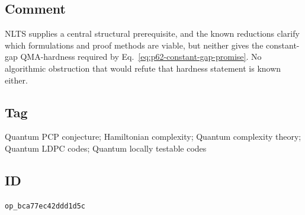 \subsection*{Comment}

NLTS supplies a central structural prerequisite, and the known reductions
clarify which formulations and proof methods are viable, but neither gives
the constant-gap QMA-hardness required by
Eq.~\eqref{eq:p62-constant-gap-promise}.  No algorithmic obstruction that
would refute that hardness statement is known either.

\subsection*{Tag}

Quantum PCP conjecture; Hamiltonian complexity; Quantum complexity theory;
Quantum LDPC codes; Quantum locally testable codes

\subsection*{ID}

\texttt{op\_bca77ec42ddd1d5c}
